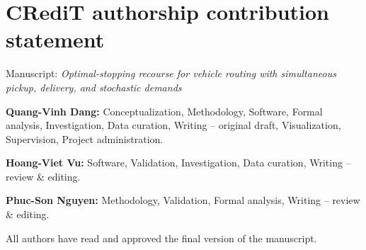 \documentclass[11pt]{article}
\begin{document}
\section*{CRediT authorship contribution statement}

Manuscript: \emph{Optimal-stopping recourse for vehicle routing
with simultaneous pickup, delivery, and stochastic demands}

\textbf{Quang-Vinh Dang:} Conceptualization, Methodology, Software,
Formal analysis, Investigation, Data curation, Writing -- original
draft, Visualization, Supervision, Project administration.

\textbf{Hoang-Viet Vu:} Software, Validation, Investigation, Data
curation, Writing -- review \& editing.

\textbf{Phuc-Son Nguyen:} Methodology, Validation, Formal analysis,
Writing -- review \& editing.

\vspace{10pt}
All authors have read and approved the final version of the
manuscript.
\end{document}
